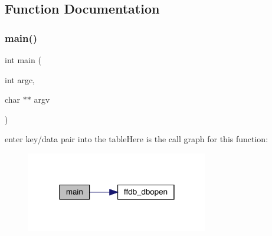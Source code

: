 \subsection{Function Documentation}
\mbox{\label{adat-devel_2other__libs_2filedb_2filehash_2tdualwrite_8c_a3c04138a5bfe5d72780bb7e82a18e627}} 
\subsubsection{\texorpdfstring{main()}{main()}}
{\footnotesize\ttfamily int main (\begin{DoxyParamCaption}\item[{int}]{argc,  }\item[{char $\ast$$\ast$}]{argv }\end{DoxyParamCaption})}

enter key/data pair into the tableHere is the call graph for this function\+:
\nopagebreak
\begin{figure}[H]
\begin{center}
\leavevmode
\includegraphics[width=225pt]{d3/d91/adat-devel_2other__libs_2filedb_2filehash_2tdualwrite_8c_a3c04138a5bfe5d72780bb7e82a18e627_cgraph}
\end{center}
\end{figure}
